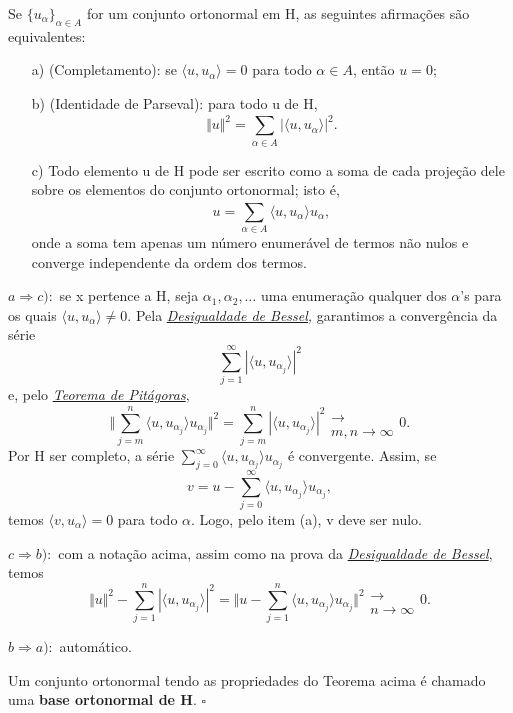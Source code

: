 \documentclass[../functional_analysis.tex]{subfiles}
\begin{document}
\begin{theorem*}
	Se \(\{u_{\alpha }\}_{\alpha \in A}\) for um conjunto ortonormal em H, as seguintes afirmações são equivalentes:
	\begin{itemize}
		\item[a)] (Completamento): se \(\langle u, u_{\alpha } \rangle=0\) para todo \(\alpha \in A\), então \(u=0\);
		\item[b)] \hypertarget{parseval_identity}{(Identidade de Parseval):} para todo u de H,
		      \[
			      \Vert u \Vert^{2}=\sum\limits_{\alpha \in A}^{}| \langle u, u_{\alpha } \rangle |^{2}.
		      \]
		\item[c)] Todo elemento u de H pode ser escrito como a soma de cada projeção dele sobre os elementos do conjunto ortonormal; isto é,
		      \[
			      u=\sum\limits_{\alpha \in A}^{} \langle u, u_{\alpha } \rangle u_{\alpha },
		      \]
		      onde a soma tem apenas um número enumerável de termos não nulos e converge independente da ordem dos termos.
	\end{itemize}
\end{theorem*}
\begin{proof*}
	\(a \Rightarrow c):\) se x pertence a H, seja \(\alpha_1,\alpha_2,\dotsc \) uma enumeração qualquer dos \(\alpha \)'s para os quais \(\langle u, u_{\alpha } \rangle\neq 0\). Pela \hyperlink{bessel_inequality}{\textit{Desigualdade de Bessel,}} garantimos a convergência da série
	\[
		\sum\limits_{j=1}^{\infty}| \langle u, u_{\alpha_{j}} \rangle |^{2}
	\]
	e, pelo \hyperlink{pythagorean_theorem}{\textit{Teorema de Pitágoras}},
	\[
		\biggl\Vert \sum\limits_{j=m}^{n}\langle u, u_{\alpha_{j}} \rangle u_{\alpha_{j}} \biggr\Vert^{2}=\sum\limits_{j=m}^{n}| \langle u, u_{\alpha_{j}} \rangle |^{2} \substack{ \\ \longrightarrow \\ m,n\to \infty}0.
	\]
	Por H ser completo, a série \(\sum\limits_{j=0}^{\infty}\langle u, u_{\alpha_{j}} \rangle u_{\alpha_{j}}\) é convergente. Assim, se
	\[
		v= u - \sum\limits_{j=0}^{\infty}\langle u, u_{\alpha_{j}} \rangle u_{\alpha_{j}},
	\]
	temos \(\langle v, u_{\alpha } \rangle =0\) para todo \(\alpha \). Logo, pelo item (a), v deve ser nulo.

	\(c \Rightarrow b):\) com a notação acima, assim como na prova da \hyperlink{bessel_inequality}{\textit{Desigualdade de Bessel}}, temos
	\[
		\Vert u \Vert^{2} -\sum\limits_{j=1}^{n}| \langle u, u_{\alpha_{j}} \rangle |^{2}=\biggl\Vert u - \sum\limits_{j=1}^{n}\langle u, u_{\alpha_{j}} \rangle u_{\alpha_{j}} \biggr\Vert^{2}\substack{ \\ \longrightarrow \\ n\to \infty}0.
	\]

	\(b \Rightarrow a):\) automático. \qedsymbol
\end{proof*}
\begin{def*}
	Um conjunto ortonormal tendo as propriedades do Teorema acima é chamado uma \textbf{base ortonormal de H}. \(\square\)
\end{def*}
\end{document}
